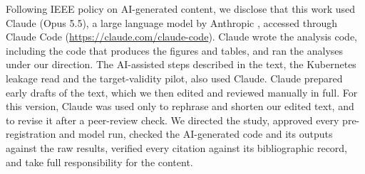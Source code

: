 Following IEEE policy on AI-generated content, we disclose that this work
used Claude (Opus 5.5), a large language model by Anthropic
\cite{anthropic2026claude}, accessed through Claude Code
(\url{https://claude.com/claude-code}). Claude wrote the analysis code,
including the code that produces the figures and tables, and ran the
analyses under our direction. The AI-assisted steps described in the text,
the Kubernetes leakage read and the target-validity pilot, also used
Claude. Claude prepared early drafts of the text, which we then edited
and reviewed manually in full. For this version, Claude was used only to rephrase
and shorten our edited text, and to revise it after a peer-review check.
We directed the study, approved every pre-registration and model run,
checked the AI-generated code and its outputs against the raw results,
verified every citation against its bibliographic record, and take full
responsibility for the content.

